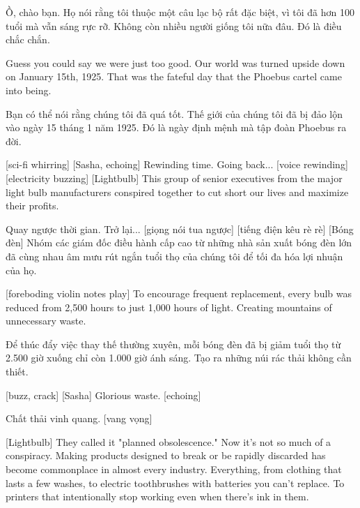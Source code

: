 \documentclass[a4paper]{article}
\begin{document}
	\begin{vietnamese-v2}
		 Ồ, chào bạn. 
		Họ nói rằng tôi thuộc một câu lạc bộ rất đặc biệt, vì tôi đã hơn 100 tuổi mà vẫn sáng rực rỡ. 
		Không còn nhiều người giống tôi nữa đâu. Đó là điều chắc chắn.
	\end{vietnamese-v2}
	
	Guess you could say we were just too good.
	Our world was turned upside down on January 15th, 1925.
	That was the fateful day that the Phoebus cartel came into being.
	
	\begin{vietnamese-v2}
		Bạn có thể nói rằng chúng tôi đã quá tốt. 
		Thế giới của chúng tôi đã bị đảo lộn vào ngày 15 tháng 1 năm 1925. 
		Đó là ngày định mệnh mà tập đoàn Phoebus ra đời.
	\end{vietnamese-v2}
	
	[sci-fi whirring]
	[Sasha, echoing] Rewinding time.
	Going back...
	[voice rewinding]
	[electricity buzzing]
	[Lightbulb] This group of senior executives from the major light bulb manufacturers conspired together to cut short our lives and maximize their profits.
	
	\begin{vietnamese-v2}
		 Quay ngược thời gian. Trở lại... [giọng nói tua ngược] [tiếng điện kêu rè rè] [Bóng đèn] Nhóm các giám đốc điều hành cấp cao từ những nhà sản xuất bóng đèn lớn đã cùng nhau âm mưu rút ngắn tuổi thọ của chúng tôi để tối đa hóa lợi nhuận của họ.
	\end{vietnamese-v2}
	
	[foreboding violin notes play]
	To encourage frequent replacement, every bulb was reduced from 2,500 hours to just 1,000 hours of light.
	Creating mountains of unnecessary waste.
	
	\begin{vietnamese-v2}
		 Để thúc đẩy việc thay thế thường xuyên, mỗi bóng đèn đã bị giảm tuổi thọ từ 2.500 giờ xuống chỉ còn 1.000 giờ ánh sáng. Tạo ra những núi rác thải không cần thiết.
	\end{vietnamese-v2}
	
	[buzz, crack]
	[Sasha] Glorious waste. [echoing]
	
	\begin{vietnamese-v2}
		 Chất thải vinh quang. [vang vọng]
	\end{vietnamese-v2}
	
	[Lightbulb] They called it "planned obsolescence."
	Now it's not so much of a conspiracy.
	Making products designed to break or be rapidly discarded has become commonplace in almost every industry.
	Everything, from clothing that lasts a few washes, to electric toothbrushes with batteries you can't replace.
	To printers that intentionally stop working even when there's ink in them.
	
\end{document}
